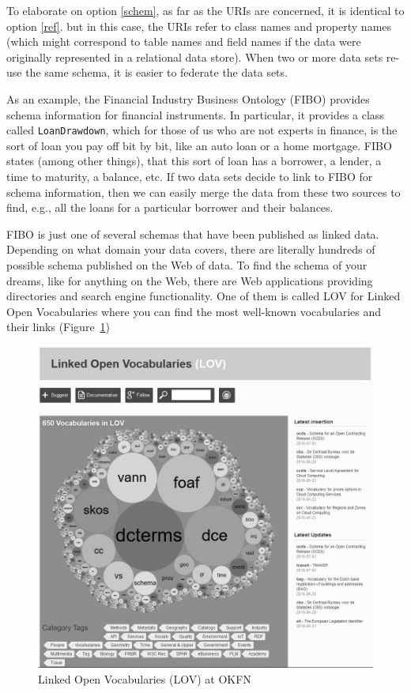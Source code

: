 To elaborate on option \ref{schem}, as far as the URIs are concerned, it is identical to option \ref{ref}. 
but in this case, the URIs refer to class names and property names (which might correspond to table names and field names 
if the data were originally represented in a relational data store).  
When two or more data sets re-use the same schema, it is easier to federate the data sets.  

As an example, the Financial Industry Business Ontology (FIBO)\cite{fibospec} provides 
schema information for financial instruments.  In particular, it provides a class called \texttt{LoanDrawdown}, which 
for those of us who are not experts in finance, is the sort of loan you pay off bit by bit, like an auto loan or a home 
mortgage. 
FIBO states (among other things), that this sort of loan has a borrower, a lender, a time to maturity, a balance, etc. If 
two data sets decide to link to FIBO for schema information, then we can easily merge the data from these two sources to 
find, e.g., all the loans for a particular borrower and their balances. 

FIBO is just one of several schemas that have been published as linked data.  Depending on what domain 
your data covers, there are literally hundreds of possible schema published on the Web of data. 
To find the schema of your dreams, like for anything on the Web, there
are Web applications providing directories and search engine
functionality. One of them is called LOV for Linked Open
Vocabularies \cite{vandenbussche2017linked} where you can find the
most well-known vocabularies and their links (Figure~\ref{fig:ch5.12})

\begin{figure}
    \centering
\includegraphics[width=5.0in]{media/ch5/figure-05-12.jpg}
    \caption{Linked Open Vocabularies (LOV) at OKFN}
    \label{fig:ch5.12}
\end{figure}

